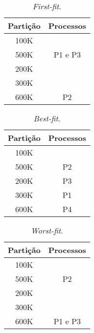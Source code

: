 \documentclass[12pt,a4paper]{article}
\begin{document}
\begin{table}[!ht]
\begin{center}
	\begin{tabular}{| c | c |}
	\hline \textbf{Partição} & \textbf{Processos} \\ \hline
	{\ttfamily 100K} &  \\ \hline
	{\ttfamily 500K} & {\ttfamily P1 e P3} \\ \hline
	{\ttfamily 200K} & \\ \hline
	{\ttfamily 300K} & {\ttfamily } \\ \hline
	{\ttfamily 600K} & {\ttfamily P2} \\ \hline
	\end{tabular}
	\caption{\textsl{First-fit}.}
\end{center}
\end{table}

\begin{table}[!ht]
\begin{center}
	\begin{tabular}{| c | c |}
	\hline \textbf{Partição} & \textbf{Processos} \\ \hline
	{\ttfamily 100K} &  \\ \hline
	{\ttfamily 500K} & {\ttfamily P2} \\ \hline
	{\ttfamily 200K} & {\ttfamily P3} \\ \hline
	{\ttfamily 300K} & {\ttfamily P1} \\ \hline
	{\ttfamily 600K} & {\ttfamily P4} \\ \hline
	\end{tabular}
	\caption{\textsl{Best-fit}.}
\end{center}
\end{table}

\begin{table}[!ht]
\begin{center}
	\begin{tabular}{| c | c |}
	\hline \textbf{Partição} & \textbf{Processos} \\ \hline
	{\ttfamily 100K} &  \\ \hline
	{\ttfamily 500K} & {\ttfamily P2} \\ \hline
	{\ttfamily 200K} & \\ \hline
	{\ttfamily 300K} & {\ttfamily } \\ \hline
	{\ttfamily 600K} & {\ttfamily P1 e P3} \\ \hline
	\end{tabular}
	\caption{\textsl{Worst-fit}.}
\end{center}
\end{table}
\end{document}
